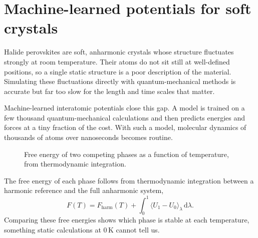 \documentclass[11pt,a4paper]{article}
\begin{document}
\section*{Machine-learned potentials for soft crystals}

Halide perovskites are soft, anharmonic crystals whose structure fluctuates strongly at room temperature.
Their atoms do not sit still at well-defined positions, so a single static structure is a poor description of the material.
Simulating these fluctuations directly with quantum-mechanical methods is accurate but far too slow for the length and time scales that matter.

Machine-learned interatomic potentials close this gap.
A model is trained on a few thousand quantum-mechanical calculations and then predicts energies and forces at a tiny fraction of the cost.
With such a model, molecular dynamics of thousands of atoms over nanoseconds becomes routine.

\begin{figure}[h]
	\centering
	\caption{Free energy of two competing phases as a function of temperature, from thermodynamic integration.}
\end{figure}

The free energy of each phase follows from thermodynamic integration between a harmonic reference and the full anharmonic system,
\begin{equation}
	F(T) = F_\text{harm}(T) + \int_0^1 \langle U_1 - U_0 \rangle_\lambda \, \mathrm{d}\lambda .
\end{equation}
Comparing these free energies shows which phase is stable at each temperature, something static calculations at 0\,K cannot tell us.
\end{document}
